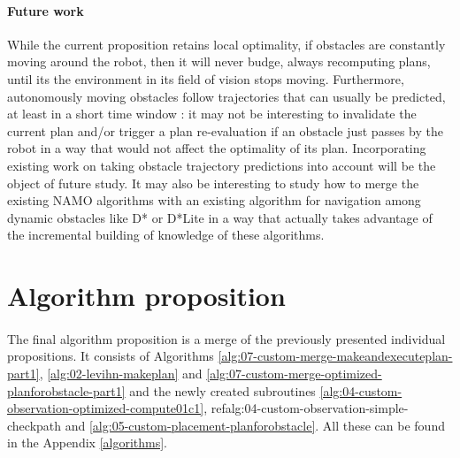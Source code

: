 \paragraph{Future work} While the current proposition retains local optimality, if obstacles are constantly moving around the robot, then it will never budge, always recomputing plans, until its the environment in its field of vision stops moving. Furthermore, autonomously moving obstacles follow trajectories that can usually be predicted, at least in a short time window : it may not be interesting to invalidate the current plan and/or trigger a plan re-evaluation if an obstacle just passes by the robot in a way that would not affect the optimality of its plan. Incorporating existing work on taking obstacle trajectory predictions into account will be the object of future study. It may also be interesting to study how to merge the existing NAMO algorithms with an existing algorithm for navigation among dynamic obstacles like D* or D*Lite in a way that actually takes advantage of the incremental building of knowledge of these algorithms.

\section{Algorithm proposition}

\paragraph{} The final algorithm proposition is a merge of the previously presented individual propositions. It consists of Algorithms \ref{alg:07-custom-merge-makeandexecuteplan-part1}, \ref{alg:02-levihn-makeplan} and \ref{alg:07-custom-merge-optimized-planforobstacle-part1} and the newly created subroutines \ref{alg:04-custom-observation-optimized-compute01c1}, ref{alg:04-custom-observation-simple-checkpath} and \ref{alg:05-custom-placement-planforobstacle}. All these can be found in the Appendix \ref{algorithms}.
